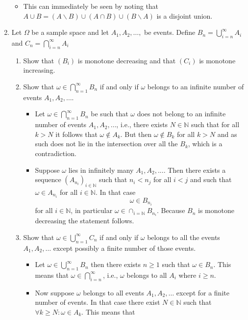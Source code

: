 \documentclass{article}
\begin{document}
\begin{enumerate}
		\begin{itemize}
			\item This can immediately be seen by noting that $A \cup B = (A \backslash B) \cup (A \cap B) \cup (B \backslash A)$ is a disjoint union.
		\end{itemize}
	\item Let $\Omega$ be a sample space and let $A_1, A_2, \dots, $ be events. Define $B_n = \bigcup_{i = n}^\infty A_i$ and $C_n = \bigcap_{i = n}^\infty A_i$
		\begin{enumerate}
			\item Show that $(B_i)$ is monotone decreasing and that $(C_i)$ is monotone increasing.
			\item Show that $\omega \in \bigcap_{n = 1}^\infty B_n$ if and only if $\omega$ belongs to an infinite number of events $A_1, A_2, \dots$.
				\begin{itemize}
					\item Let $\omega \in \bigcap_{n = 1}^\infty B_n$ be such that $\omega$ does not belong to an infinite number of events $A_1, A_2, \dots$, i.e., there exists $N \in \mathbb{N}$ such that for all $k > N$ it follows that $\omega \notin A_k$. But then $\omega \notin B_k$ for all $k > N$ and as such does not lie in the intersection over all the $B_k$, which is a contradiction.
					\item Suppose $\omega$ lies in infinitely many $A_1, A_2, ...$. Then there exists a sequence $(A_{n_i})_{i \in \mathbb{N}}$ such that $n_i < n_{j}$ for all $i < j$ and such that $\omega \in A_{n_i}$ for all $i \in \mathbb{N}$. In that case
					$$
					\omega \in B_{n_i}
					$$
					for all $i \in \mathbb{N}$, in particular $\omega \in \cap_{i = \mathbb{N}} B_{n_i}$. Because $B_n$ is monotone decreasing the statement follows.
				\end{itemize}
			\item Show that $\omega \in \bigcup_{n = 1}^\infty C_n$ if and only if $\omega$ belongs to all the events $A_1, A_2, \dots$ except possibly a finite number of those events.
				\begin{itemize}
					\item Let $\omega \in \bigcup_{n = 1}^\infty B_n$ then there exists $n \geq 1$ such that $\omega \in B_n$. This means that $\omega \in \bigcap_{i = n}^\infty$, i.e., $\omega$ belongs to all $A_i$ where $i \geq n$.
					\item Now suppose $\omega$ belongs to all events $A_1, A_2, \dots$ except for a finite number of events. In that case there exist $N \in \mathbb{N}$ such that $\forall k \geq N : \omega \in A_k$. This means that

\end{itemize}
\end{enumerate}
\end{enumerate}
\end{document}
